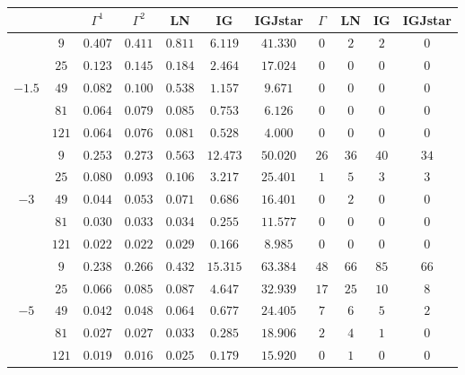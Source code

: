 \begin{table}[hbt]
\begin{tabular}{cc|ccccc|cccc}
		&  & $\Gamma^1$ & $\Gamma^2$ & LN & IG & IGJstar & $\Gamma$ & LN & IG & IGJstar\\ 
		\midrule				
		\multirow{5 }{*}{$-1.5$} 
		 &  $9  $ 	&  	 $0.407$ 	&	 $0.411$ 	&	 $0.811$ 	&	 $6.119$  	&	 $41.330$ 	&	$0$		&	$2$			&	$2$			&	$0$ \\
		 &  $25 $ 	&  	 $0.123$ 	&	 $0.145$ 	&	 $0.184$ 	&	 $2.464$  	&	 $17.024$ 	&	$0$		&	$0$			&	$0$			&	$0$ \\
		 &  $49 $ 	&  	 $0.082$ 	&	 $0.100$ 	&	 $0.538$ 	&	 $1.157$  	&	 $9.671$ 	&	$0$		&	$0$			&	$0$			&	$0$ \\
		 &  $81 $ 	&  	 $0.064$ 	&	 $0.079$ 	&	 $0.085$ 	&	 $0.753$  	&	 $6.126$ 	&	$0$		&	$0$			&	$0$			&	$0$ \\
		 &  $121$ 	&  	 $0.064$ 	&	 $0.076$ 	&	 $0.081$ 	&	 $0.528$  	&	 $4.000$ 	&	$0$		&	$0$			&	$0$			&	$0$ \\
		\cmidrule(r){1-7}
		 \cmidrule(r){8-11}									
		 \multirow{5 }{*}{$-3$}	
		 &  $9  $ 	&  	 $0.253$ 	&	 $0.273$ 	&	 $0.563$ 	&	 $12.473$ 	&	 $50.020$ 	&	$26$	&	$36$		&\textbf{$40$} 	& $34$ \\
		 &  $25 $ 	&  	 $0.080$ 	&	 $0.093$ 	&	 $0.106$ 	&	 $3.217$  	&	 $25.401$ 	&	$1$		&	$5$			&	$3$			&	$3$ \\
		 &  $49 $ 	&  	 $0.044$ 	&	 $0.053$ 	&	 $0.071$ 	&	 $0.686$  	&	 $16.401$ 	&	$0$		&	$2$			&	$0$			&	$0$ \\
		 &  $81 $ 	&  	 $0.030$ 	&	 $0.033$ 	&	 $0.034$ 	&	 $0.255$  	&	 $11.577$ 	&	$0$		&	$0$			&	$0$			&	$0$ \\
		 &  $121$ 	&  	 $0.022$ 	&	 $0.022$ 	&	 $0.029$ 	&	 $0.166$  	&	 $8.985$ 	&	$0$		&	$0$		    &	$0$			&	$0$ \\
		\cmidrule(r){1-7}
		\cmidrule(r){8-11}										
		 \multirow{5 }{*}{$-5$}	
		 &  $9  $ 	&  	 $0.238$ 	&	 $0.266$ 	&	 $0.432$ 	&	 $15.315$ 	&	 $63.384$ 	&	$48$	&	$66$		&\textbf{$85$} 	&	$66$ \\
		 &  $25 $ 	&  	 $0.066$ 	&	 $0.085$ 	&	 $0.087$ 	&	 $4.647$  	&	 $32.939$ 	&	$17$	&\textbf{$25$} 	&	$10$ 		&	$8$ \\
		 &  $49 $ 	&  	 $0.042$ 	&	 $0.048$ 	&	 $0.064$ 	&	 $0.677$  	&	 $24.405$ 	&	$7$		&	$6$			&	$5$			&	$2$ \\
		 &  $81 $ 	&  	 $0.027$ 	&	 $0.027$ 	&	 $0.033$ 	&	 $0.285$  	&	 $18.906$ 	&	$2$		&	$4$			&	$1$			&	$0$ \\
		 &  $121$ 	&  	 $0.019$ 	&	 $0.016$ 	&	 $0.025$ 	&	 $0.179$  	&	 $15.920$ 	&	$0$		&	$1$			&	$0$			&	$0$ \\
		\cmidrule(r){1-7}

\end{tabular}
\end{table}
